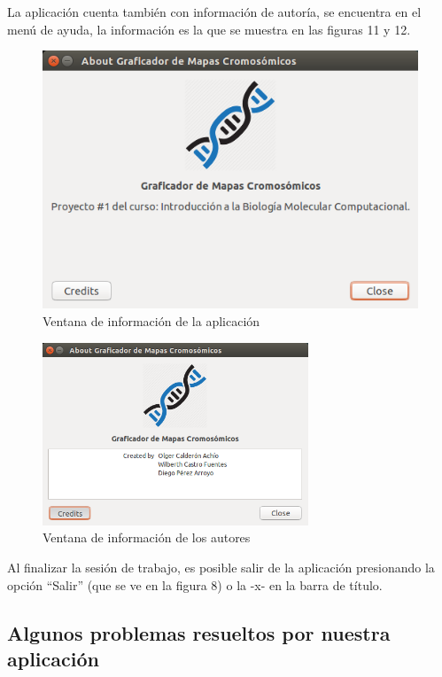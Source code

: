 \documentclass{article}
\begin{document}
	La aplicación cuenta también con información de autoría, se encuentra en el menú de ayuda, la información es la que se muestra en las figuras 11 y 12.
	
	\begin{figure}[h!]
		\centering
			\includegraphics[scale=0.72, keepaspectratio=false]{report8}
				\caption{Ventana de información de la aplicación}
	\end{figure}
	\pagebreak
	\begin{figure}[h!]
		\centering
			\includegraphics[width=300px, keepaspectratio=false]{report9}
				\caption{Ventana de información de los autores}
	\end{figure}

	
	Al finalizar la sesión de trabajo, es posible salir de la aplicación presionando la opción ``Salir'' (que se ve en la figura 8) o la -x- en la barra de título.	
\pagebreak
	
	\subsection{Algunos problemas resueltos por nuestra aplicación}
\end{document}
